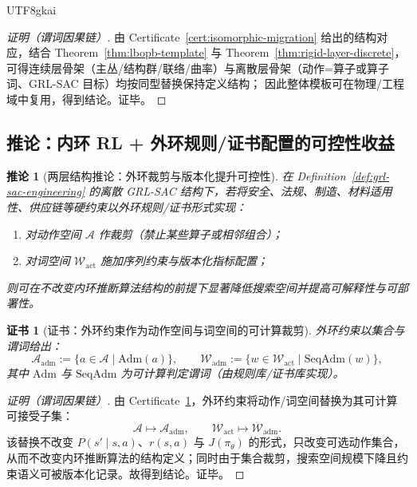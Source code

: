 \documentclass[12pt]{article}
\newtheorem{corollary}{推论}[section]
\newtheorem{certificate}{证书}[section]
\begin{document}
\begin{CJK*}{UTF8}{gkai}
\begin{proof}[证明（谓词因果链）]
由 Certificate~\ref{cert:isomorphic-migration} 给出的结构对应，结合 Theorem~\ref{thm:lbopb-template} 与 Theorem~\ref{thm:rigid-layer-discrete}，
可得连续层骨架（主丛/结构群/联络/曲率）与离散层骨架（动作=算子或算子词、GRL-SAC 目标）均按同型替换保持定义结构；
因此整体模板可在物理/工程域中复用，得到结论。证毕。
\end{proof}

\subsection{推论：内环 RL + 外环规则/证书配置的可控性收益}

\begin{corollary}[两层结构推论：外环裁剪与版本化提升可控性]
\label{cor:two-loop-control}
在 Definition~\ref{def:grl-sac-engineering} 的离散 GRL-SAC 结构下，若将安全、法规、制造、材料适用性、供应链等硬约束以外环规则/证书形式实现：
\begin{enumerate}
  \item 对动作空间 $\mathcal{A}$ 作裁剪（禁止某些算子或相邻组合）；
  \item 对词空间 $\mathcal{W}_{\mathrm{act}}$ 施加序列约束与版本化指标配置；
\end{enumerate}
则可在不改变内环推断算法结构的前提下显著降低搜索空间并提高可解释性与可部署性。
\end{corollary}

\begin{certificate}[证书：外环约束作为动作空间与词空间的可计算裁剪]
\label{cert:outer-loop-pruning}
外环约束以集合与谓词给出：
\[
\mathcal{A}_{\mathrm{adm}}:=\{a\in\mathcal{A}\mid \mathrm{Adm}(a)\},\qquad
\mathcal{W}_{\mathrm{adm}}:=\{w\in\mathcal{W}_{\mathrm{act}}\mid \mathrm{SeqAdm}(w)\},
\]
其中 $\mathrm{Adm}$ 与 $\mathrm{SeqAdm}$ 为可计算判定谓词（由规则库/证书库实现）。
\end{certificate}

\begin{proof}[证明（谓词因果链）]
由 Certificate~\ref{cert:outer-loop-pruning}，外环约束将动作/词空间替换为其可计算可接受子集：
\[
\mathcal{A}\mapsto \mathcal{A}_{\mathrm{adm}},\qquad
\mathcal{W}_{\mathrm{act}}\mapsto \mathcal{W}_{\mathrm{adm}}.
\]
该替换不改变 $P(s'\mid s,a)$、$r(s,a)$ 与 $J(\pi_\theta)$ 的形式，只改变可选动作集合，从而不改变内环推断算法的结构定义；同时由于集合裁剪，搜索空间规模下降且约束语义可被版本化记录。故得到结论。证毕。
\end{proof}


\end{CJK*}
\end{document}
